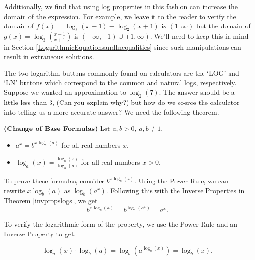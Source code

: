 \documentclass{ximera}
\begin{document}
Additionally, we find that using log properties in this fashion can increase the domain of the expression.  For example, we leave it to the reader to verify the domain of $f(x) = \log_{3}(x-1) - \log_{3}(x+1)$ is $(1,\infty)$ but the domain of $g(x) = \log_{3}\left(\frac{x-1}{x+1}\right)$ is $(-\infty, -1) \cup (1, \infty)$.  We'll need to keep this in mind in Section \ref{LogarithmicEquationsandInequalities} since such manipulations can result in extraneous solutions.

The two logarithm buttons commonly found on calculators are the `LOG' and `LN' buttons which correspond to the common and natural logs, respectively.  Suppose we wanted an approximation to $\log_{2}(7)$.  The answer should be a little less than $3$, (Can you explain why?) but how do we coerce the calculator into telling us a more accurate answer?  We need the following theorem.




\begin{theorem} \label{changeofbase} \textbf{(Change of Base Formulas)} Let $a,b >0$, $a,b \neq 1$.   

\begin{itemize}

\item  $a^{x} = b^{x \log_{b}(a)}$ for all real numbers $x$.

\item  $\log_{a}(x) = \frac{\log_{b}(x)}{\log_{b}(a)}$ for all real numbers $x > 0$.

\end{itemize}

\end{theorem}




To prove these formulas, consider $b^{x \log_{b}(a)}$. Using the Power Rule, we can rewrite $x \log_{b}(a)$ as $\log_{b}\left(a^{x}\right)$.  Following this with the Inverse Properties in Theorem \ref{invpropslogs}, we get \[ b^{x \log_{b}(a)} = b^{\log_{b}\left(a^{x}\right)} = a^{x}.\] 

 To verify the logarithmic form of the property, we use the Power Rule and an Inverse Property to get: 
 
\[\log_{a}(x) \cdot \log_{b}(a) =  \log_{b} \left(a^{\log_{a}(x)}\right) = \log_{b}(x).\] 
  
\end{document}
